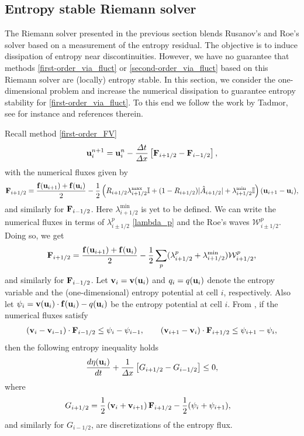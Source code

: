 \documentclass[preprint, 11pt]{article}
\newcommand{\W}{{\mathcal W}}
\newcommand{\bff}{{\bf f}}
\newcommand{\bfF}{{\bf F}}
\newcommand{\bfu}{{\bf u}}
\newcommand{\bfv}{{\bf v}}
\begin{document}
\subsection{Entropy stable Riemann solver}
The Riemann solver presented in the previous section blends Rusanov's and Roe's solver based on a
measurement of the entropy residual. The objective is to induce dissipation of entropy 
near discontinuities. However, we have no guarantee that methods \eqref{first-order_via_fluct} 
or \eqref{second-order_via_fluct} based on this Riemann solver are (locally) entropy stable. 
In this section, we consider the one-dimensional problem and increase the numerical dissipation 
to guarantee entropy stability for \eqref{first-order_via_fluct}. 
To this end we follow the work by Tadmor, see for instance \cite{tadmor1987numerical, tadmor2003entropy} 
and references therein. 

Recall method \eqref{first-order_FV}
\begin{align*}
  \bfu_i^{n+1}=\bfu_i^n-\frac{\Delta t}{\Delta x}\left[\bfF_{i+1/2}-\bfF_{i-1/2}\right],
\end{align*}
with the numerical fluxes given by 
\begin{align*}
  \bfF_{i+1/2} = \frac{\bff(\bfu_{i+1})+\bff(\bfu_i)}{2} 
  - \frac{1}{2} \left( R_{i+1/2}\lambda_{i+1/2}^{\max}\mathbb{I} + (1-R_{i+1/2})|\hat A_{i+1/2}| +\lambda_{i+1/2}^{\min}\mathbb{I}\right)(\bfu_{i+1}-\bfu_{i}),
\end{align*}
and similarly for $\bfF_{i-1/2}$. Here $\lambda_{i+1/2}^{\min}$ is yet to be defined.
We can write the numerical fluxes in terms of $\lambda^p_{i\pm 1/2}$ \eqref{lambda_p}
and the Roe's waves $\W_{i\pm 1/2}^p$.
Doing so, we get
\begin{align*}
  \bfF_{i+1/2} = \frac{\bff(\bfu_{i+1})+\bff(\bfu_i)}{2} 
  - \frac{1}{2}\sum_p(\lambda_{i+1/2}^p+\lambda_{i+1/2}^{\min})\W_{i+1/2}^p,
\end{align*}
and similarly for $\bfF_{i-1/2}$.
Let $\bfv_i=\bfv(\bfu_i)$ and $q_i=q(\bfu_i)$ denote the entropy variable and the 
(one-dimensional) entropy potential at cell $i$, respectively. 
Also let $\psi_i=\bfv(\bfu_i)\cdot \bff(\bfu_i)-q(\bfu_i)$ be the entropy potential at cell $i$.
From \cite[\S 4]{tadmor1987numerical}, if the numerical fluxes satisfy
\begin{align}\label{es_cond}
(\bfv_{i}-\bfv_{i-1})\cdot \bfF_{i-1/2}\leq \psi_{i}-\psi_{i-1},
  \qquad
  (\bfv_{i+1}-\bfv_i)\cdot \bfF_{i+1/2}\leq \psi_{i+1}-\psi_i,
\end{align}
then the following entropy inequality holds 
\begin{align}\label{ent_ineq}
  \frac{d\eta(\bfu_i)}{dt}+\frac{1}{\Delta x}\left[G_{i+1/2}-G_{i-1/2}\right]\leq 0,
\end{align}
where 
\begin{align*}
    G_{i+1/2} &= \frac{1}{2}\left(\bfv_i+\bfv_{i+1}\right)\bfF_{i+1/2}-\frac{1}{2}(\psi_{i}+\psi_{i+1}),
\end{align*}
and similarly for $G_{i-1/2}$, are discretizations of the entropy flux. 
\end{document}
